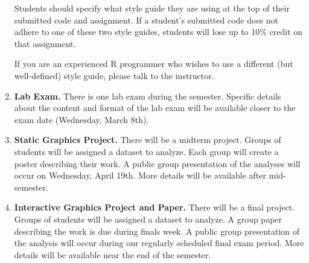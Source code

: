 \documentclass[11pt]{article}
\begin{document}
\begin{enumerate}
Students should specify what style guide they are using at the top of their submitted code and assignment.  If a student's submitted code does not adhere to one of these two style guides, students will lose up to 10\% credit on that assignment.

If you are an experienced R programmer who wishes to use a different (but well-defined) style guide, please talk to the instructor.  




\item {\bf Lab Exam.} There is one lab exam during the semester.  Specific details about the content and format of the lab exam will be available closer to the exam date (Wednesday, March 8th).  %


\item {\bf Static Graphics Project.} There will be a midterm project.  Groups of students will be assigned a dataset to analyze.  Each group will create a poster describing their work.  A public group presentation of the analyses will occur on Wednesday, April 19th.  More details will be available after mid-semester.

\item {\bf Interactive Graphics Project and Paper.} There will be a final project.  Groups of students will be assigned a dataset to analyze.  A group paper describing the work is due during finals week.  A public group presentation of the analysis will occur during our regularly scheduled final exam period.  More details will be available near the end of the semester.



\end{enumerate}
\end{document}
